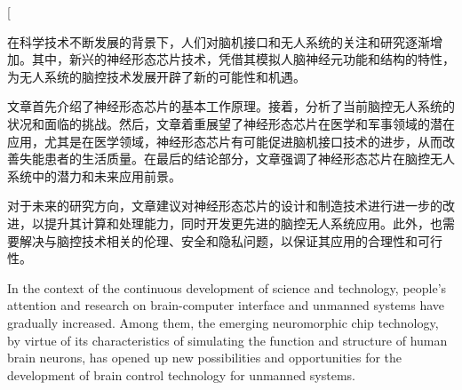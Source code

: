 \documentclass{thuemp}
\begin{document}



\twocolumn[
\begin{@twocolumnfalse}
\maketitle

\begin{empAbstract}
  在科学技术不断发展的背景下，人们对脑机接口和无人系统的关注和研究逐渐增加。其中，新兴的神经形态芯片技术，凭借其模拟人脑神经元功能和结构的特性，为无人系统的脑控技术发展开辟了新的可能性和机遇。
  
  文章首先介绍了神经形态芯片的基本工作原理。接着，分析了当前脑控无人系统的状况和面临的挑战。然后，文章着重展望了神经形态芯片在医学和军事领域的潜在应用，尤其是在医学领域，神经形态芯片有可能促进脑机接口技术的进步，从而改善失能患者的生活质量。在最后的结论部分，文章强调了神经形态芯片在脑控无人系统中的潜力和未来应用前景。
  
  对于未来的研究方向，文章建议对神经形态芯片的设计和制造技术进行进一步的改进，以提升其计算和处理能力，同时开发更先进的脑控无人系统应用。此外，也需要解决与脑控技术相关的伦理、安全和隐私问题，以保证其应用的合理性和可行性。
\end{empAbstract}


\begin{empAbstractEn}
  In the context of the continuous development of science and technology, people's attention and research on brain-computer interface and unmanned systems have gradually increased. Among them, the emerging neuromorphic chip technology, by virtue of its characteristics of simulating the function and structure of human brain neurons, has opened up new possibilities and opportunities for the development of brain control technology for unmanned systems.
  

\end{empAbstractEn}
\end{@twocolumnfalse}
\end{document}
